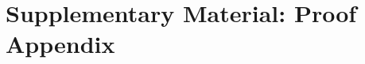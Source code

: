 \documentclass[letterpaper]{article} %
\begin{document}
\section{Supplementary Material: Proof Appendix}
%
\end{document}

